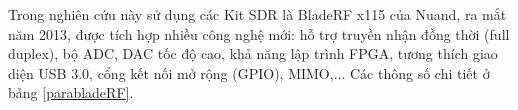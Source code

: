 Trong nghiên cứu này  sử dụng các Kit SDR là BladeRF x115 của Nuand, ra mắt năm 2013, được tích hợp nhiều công nghệ mới: hỗ trợ truyền nhận đồng thời (full duplex), bộ ADC, DAC tốc độ cao, khả năng lập trình FPGA, tương thích giao diện USB 3.0, cổng kết nối mở rộng (GPIO), MIMO,... Các thông số chi tiết ở bảng \ref{parabladeRF}.


